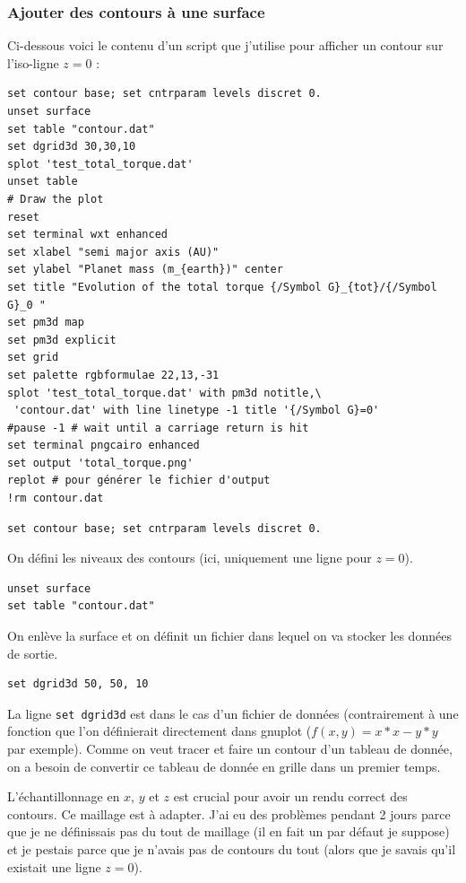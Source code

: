 \documentclass[a4paper,twoside]{article}
\begin{document}
\subsubsection{Ajouter des contours à une surface}
Ci-dessous voici le contenu d'un script que j'utilise pour afficher un contour sur l'iso-ligne $z=0$ : 
\begin{verbatim}
set contour base; set cntrparam levels discret 0.
unset surface
set table "contour.dat"
set dgrid3d 30,30,10
splot 'test_total_torque.dat'
unset table
# Draw the plot
reset
set terminal wxt enhanced
set xlabel "semi major axis (AU)"
set ylabel "Planet mass (m_{earth})" center
set title "Evolution of the total torque {/Symbol G}_{tot}/{/Symbol G}_0 "
set pm3d map
set pm3d explicit
set grid
set palette rgbformulae 22,13,-31
splot 'test_total_torque.dat' with pm3d notitle,\
 'contour.dat' with line linetype -1 title '{/Symbol G}=0'
#pause -1 # wait until a carriage return is hit
set terminal pngcairo enhanced
set output 'total_torque.png'
replot # pour générer le fichier d'output
!rm contour.dat
\end{verbatim}

\bigskip
\begin{verbatim}
set contour base; set cntrparam levels discret 0.
\end{verbatim}
On défini les niveaux des contours (ici, uniquement une ligne pour $z=0$).

\begin{verbatim}
unset surface
set table "contour.dat"
\end{verbatim}
On enlève la surface et on définit un fichier dans lequel on va stocker les données de sortie.

\begin{verbatim}
set dgrid3d 50, 50, 10
\end{verbatim}
La ligne \texttt{set dgrid3d} est dans le cas d'un fichier de données (contrairement à une fonction que l'on définierait directement dans gnuplot ($f(x,y) = x*x - y*y$ par exemple). Comme on veut tracer et faire un contour d'un tableau de donnée, on a besoin de convertir ce tableau de donnée en grille dans un premier temps.

\begin{attention}
L'échantillonnage en $x$, $y$ et $z$ est crucial pour avoir un rendu correct des contours. Ce maillage est à adapter. J'ai eu des problèmes pendant 2 jours parce que je ne définissais pas du tout de maillage (il en fait un par défaut je suppose) et je pestais parce que je n'avais pas de contours du tout (alors que je savais qu'il existait une ligne $z=0$).
\end{attention}
\end{document}

